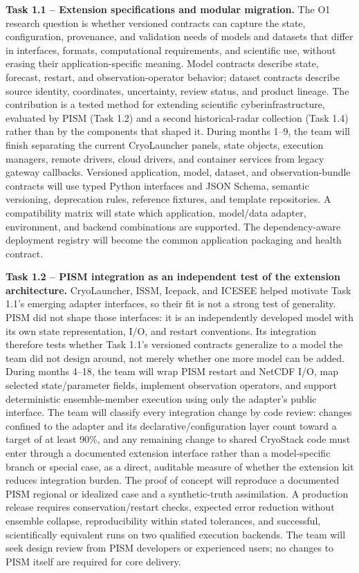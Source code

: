 \textbf{Task 1.1 -- Extension specifications and modular migration.} The O1
research question is whether versioned contracts can capture the state,
configuration, provenance, and validation needs of models and datasets that
differ in interfaces, formats, computational requirements, and scientific use,
without erasing their application-specific meaning. Model contracts describe
state, forecast, restart, and observation-operator behavior; dataset contracts
describe source identity, coordinates, uncertainty, review status, and product
lineage. The contribution is a tested method for extending scientific
cyberinfrastructure, evaluated by PISM (Task 1.2) and a second historical-radar
collection (Task 1.4) rather than by the components that shaped it. During
months 1--9, the team will finish separating the current CryoLauncher panels,
state objects, execution managers, remote drivers, cloud drivers, and
container services from legacy gateway callbacks. Versioned application,
model, dataset, and observation-bundle contracts will use typed Python
interfaces and JSON Schema, semantic versioning, deprecation rules, reference
fixtures, and template repositories. A compatibility matrix will state which
application, model/data adapter, environment, and backend combinations are
supported. The dependency-aware deployment registry will become the common
application packaging and health contract.

\textbf{Task 1.2 -- PISM integration as an independent test of the extension
architecture.} CryoLauncher, ISSM, Icepack, and ICESEE helped motivate
Task 1.1's emerging adapter interfaces, so their fit is not a strong test of
generality. PISM did not shape those interfaces: it is an independently
developed model with its own state representation, I/O, and restart
conventions. Its integration therefore tests whether Task 1.1's versioned
contracts generalize to a model the team did not design around, not merely
whether one more model can be added. During months 4--18, the team will wrap
PISM restart and NetCDF I/O, map selected state/parameter fields, implement
observation operators, and support deterministic ensemble-member execution
using only the adapter's public interface. The team will classify every
integration change by code review: changes confined to the adapter and its
declarative/configuration layer count toward a target of at least 90\%, and
any remaining change to shared CryoStack code must enter through a
documented extension interface rather than a model-specific branch or
special case, as a direct, auditable measure of whether the extension kit
reduces integration burden. The proof of concept
will reproduce a documented PISM regional or idealized case and a
synthetic-truth assimilation. A production release requires conservation/restart
checks, expected error reduction without ensemble collapse, reproducibility
within stated tolerances, and successful, scientifically equivalent runs on
two qualified execution backends. The team will seek design review from PISM
developers or experienced users; no changes to PISM itself are required for
core delivery.

